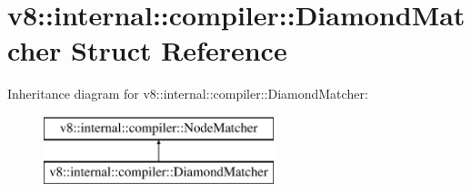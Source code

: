 \hypertarget{structv8_1_1internal_1_1compiler_1_1_diamond_matcher}{}\section{v8\+:\+:internal\+:\+:compiler\+:\+:Diamond\+Matcher Struct Reference}
\label{structv8_1_1internal_1_1compiler_1_1_diamond_matcher}
Inheritance diagram for v8\+:\+:internal\+:\+:compiler\+:\+:Diamond\+Matcher\+:\begin{figure}[H]
\begin{center}
\leavevmode
\includegraphics[height=2.000000cm]{structv8_1_1internal_1_1compiler_1_1_diamond_matcher}
\end{center}
\end{figure}
